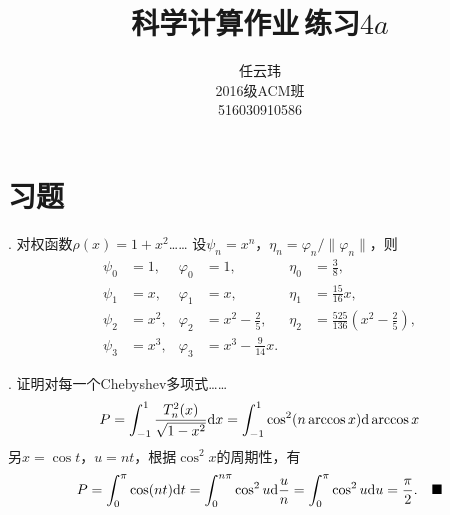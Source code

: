

\title{科学计算作业$\,$练习$4a$}
\author{\small 任云玮\\\small2016级ACM班\\\small516030910586}
\date{}


\maketitle

\section{习题}

. 对权函数$\rho(x)=1+x^2$……
\ans
  设$\psi_n = x^n$，$\eta_n = \varphi_n / \|\varphi_n\|$，则
  \begin{align*}
    \psi_0 &= 1, & \varphi_0 &= 1, & \eta_0 &= \frac{3}{8}, \\
    \psi_1 &= x, & \varphi_1 &= x, & \eta_1 &= \frac{15}{16}x, \\
    \psi_2 &= x^2, & \varphi_2 &=  x^2-\frac{2}{5}, & \eta_2 &= \frac{525}{136}\left(x^2-\frac{2}{5}\right), \\
    \psi_3 &= x^3, & \varphi_3 &= x^3-\frac{9}{14}x. & &
  \end{align*}

\vspace{1cm}
\par{}. 证明对每一个Chebyshev多项式……
\proof
  \[
    P = \int_{-1}^1\frac{T^2_n(x)}{\sqrt{1-x^2}}\mathrm{d} x
    = \int_{-1}^1\cos^2(n\arccos x)\mathrm{d} \arccos x
  \]
  另$x = \cos t$，$u = nt$，根据$\cos^2x$的周期性，有
  \[
    P = \int_0^\pi \cos(nt) \mathrm{d} t =
    \int_0^{n\pi}\cos^2u\mathrm{d} \frac{u}{n} =
    \int_0^\pi\cos^2u\mathrm{d} u = \frac{\pi}{2}.\quad\blacksquare
  \]

